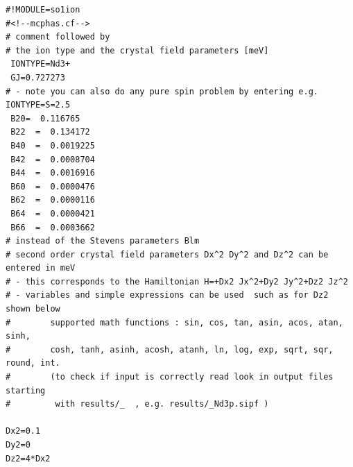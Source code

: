 \begin{verbatim}
#!MODULE=so1ion
#<!--mcphas.cf-->
# comment followed by
# the ion type and the crystal field parameters [meV]
 IONTYPE=Nd3+
 GJ=0.727273
# - note you can also do any pure spin problem by entering e.g. IONTYPE=S=2.5 
 B20=  0.116765                                           
 B22  =  0.134172                                           
 B40  =  0.0019225                                          
 B42  =  0.0008704                                          
 B44  =  0.0016916                                          
 B60  =  0.0000476                                          
 B62  =  0.0000116                                          
 B64  =  0.0000421                                          
 B66  =  0.0003662       
# instead of the Stevens parameters Blm 
# second order crystal field parameters Dx^2 Dy^2 and Dz^2 can be entered in meV
# - this corresponds to the Hamiltonian H=+Dx2 Jx^2+Dy2 Jy^2+Dz2 Jz^2
# - variables and simple expressions can be used  such as for Dz2 shown below
#        supported math functions : sin, cos, tan, asin, acos, atan, sinh, 
#        cosh, tanh, asinh, acosh, atanh, ln, log, exp, sqrt, sqr, round, int.
#        (to check if input is correctly read look in output files starting 
#         with results/_  , e.g. results/_Nd3p.sipf )

Dx2=0.1
Dy2=0
Dz2=4*Dx2
\end{verbatim}

